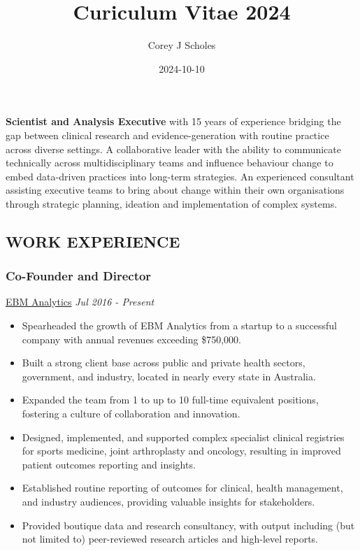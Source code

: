 \documentclass[
  letterpaper,
  DIV=11,
  numbers=noendperiod]{scrartcl}
\title{Curiculum Vitae 2024}
\author{Corey J Scholes}
\date{2024-10-10}
\providecommand{\tightlist}{%
  \setlength{\itemsep}{0pt}\setlength{\parskip}{0pt}}\usepackage{longtable,booktabs,array}
\begin{document}
\maketitle

\textbf{Scientist and Analysis Executive} with 15 years of experience
bridging the gap between clinical research and evidence-generation with
routine practice across diverse settings. A collaborative leader with
the ability to communicate technically across multidisciplinary teams
and influence behaviour change to embed data-driven practices into
long-term strategies. An experienced consultant assisting executive
teams to bring about change within their own organisations through
strategic planning, ideation and implementation of complex systems.

\subsection{WORK EXPERIENCE}\label{work-experience}

\subsubsection{Co-Founder and Director}\label{co-founder-and-director}

\href{www.ebmanalytics.com.au}{EBM Analytics} {\emph{Jul 2016 -
Present}}

\begin{itemize}
\tightlist
\item
  Spearheaded the growth of EBM Analytics from a startup to a successful
  company with annual revenues exceeding \$750,000.
\item
  Built a strong client base across public and private health sectors,
  government, and industry, located in nearly every state in Australia.
\item
  Expanded the team from 1 to up to 10 full-time equivalent positions,
  fostering a culture of collaboration and innovation.
\item
  Designed, implemented, and supported complex specialist clinical
  registries for sports medicine, joint arthroplasty and oncology,
  resulting in improved patient outcomes reporting and insights.
\item
  Established routine reporting of outcomes for clinical, health
  management, and industry audiences, providing valuable insights for
  stakeholders.
\item
  Provided boutique data and research consultancy, with output including
  (but not limited to) peer-reviewed research articles and high-level
  reports.
\end{itemize}
\end{document}
